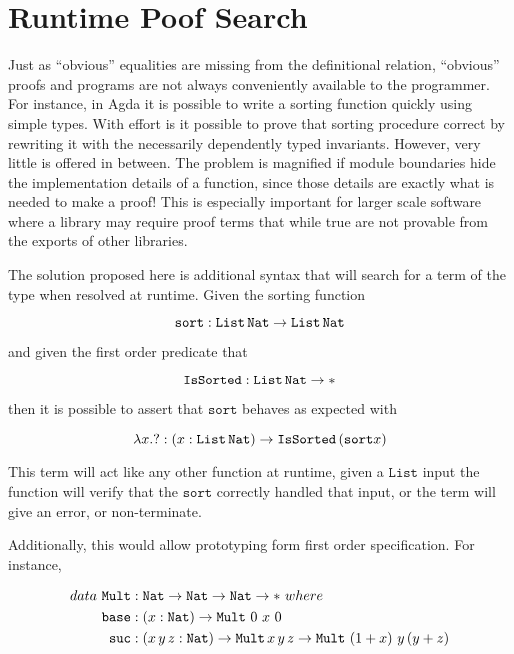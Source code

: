 \section{Runtime Poof Search}

Just as ``obvious'' equalities are missing from the definitional relation, ``obvious'' proofs and programs are not always conveniently available to the programmer.
For instance, in Agda it is possible to write a sorting function quickly using simple types.
With effort is it possible to prove that sorting procedure correct by rewriting it with the necessarily dependently typed invariants.
However, very little is offered in between.
The problem is magnified if module boundaries hide the implementation details of a function, since those details are exactly what is needed to make a proof!
This is especially important for larger scale software where a library may require proof terms that while true are not provable from the exports of other libraries.

The solution proposed here is additional syntax that will search for a term of the type when resolved at runtime.
Given the sorting function 

\[
\mathtt{sort}:\mathtt{List}\,\mathtt{Nat}{}\rightarrow\mathtt{List}\,\mathtt{Nat}{}
\]

and given the first order predicate that 

\[
\mathtt{IsSorted}:\mathtt{List}\,\mathtt{Nat}{}\rightarrow*
\]

then it is possible to assert that $\mathtt{sort}$ behaves as expected with

\[
\lambda x.?:\left(x:\mathtt{List}\,\mathtt{Nat}{}\right)\rightarrow\mathtt{IsSorted}\left(\mathtt{sort}x\right)
\]

This term will act like any other function at runtime, given a $\mathtt{List}$ input the function will verify that the $\mathtt{sort}$ correctly handled that input, or the term will give an error, or non-terminate.

Additionally, this would allow prototyping form first order specification.
For instance,

\begin{align*}
data\ \mathtt{Mult} & :\Nat{}\rightarrow\Nat{}\rightarrow\Nat{}\rightarrow*\ where\\
\mathtt{base} & :\left(x:\Nat{}\right)\rightarrow\mathtt{Mult}\ 0\ x\ 0\\
\mathtt{suc} & :\left(x\,y\,z:\Nat{}\right)\rightarrow\mathtt{Mult}\,x\,y\,z\rightarrow\mathtt{Mult}\,\left(1+x\right)\,y\,(y+z)
\end{align*}

